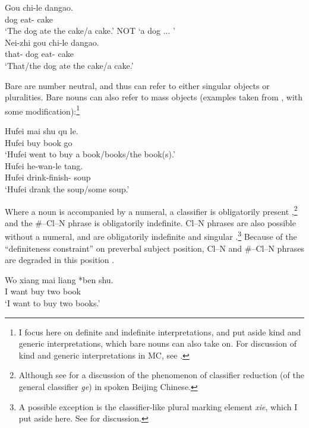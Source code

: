 \documentclass[output=paper
,modfonts
,nonflat]{langsci/langscibook}
\begin{document}
\ea \label{ex:hall:3}
\ea \label{ex:hall:3a}
\gll Gou chi-le dangao. \\
 dog eat-{} cake \\
\glt `The dog ate the cake/a cake.' NOT `a dog ... ' \\
\ex \label{ex:hall:3b}
\gll Nei-zhi gou chi-le dangao. \\
that-{} dog eat-{} cake \\
\glt `That/the dog ate the cake/a cake.' \\
\z
\z

Bare  are number neutral, and thus can refer to either singular objects or pluralities. Bare nouns can also refer to mass objects (examples taken from \citealt{ChengSybesma1999}, with some modification):\footnote{I focus here on definite and indefinite interpretations, and put aside kind and generic interpretations, which bare nouns can also take on. For discussion of kind and generic interpretations in MC, see \citet{Krifka1995}.}

\ea \label{ex:hall:4}
\ea
\gll Hufei mai shu qu le.\\
 Hufei buy book go {}\\
\glt `Hufei went to buy a book/books/the book(s).'\\

\ex
\gll Hufei he-wan-le tang.\\
 Hufei drink-finish-{} soup\\
\glt `Hufei drank the soup/some soup.'\\
\z
\z


Where a noun is accompanied by a numeral, a classifier is obligatorily present ,\footnote{Although see \citet{Tao2006} for a discussion of the phenomenon of classifier reduction (of the general classifier \textit{ge}) in spoken Beijing  Chinese.} and the \#--Cl--N phrase is obligatorily indefinite. Cl--N phrases are also possible without a numeral, and are obligatorily indefinite and singular .\footnote{A possible exception is the classifier-like plural marking element \textit{xie}, which I put aside here. See \citet[\S4.2.3]{Hall2015} for discussion.} Because of the ``definiteness constraint'' on preverbal subject position, Cl--N and \#--Cl--N phrases are degraded in this position . 

\ea \label{ex:hall:5}
\gll 
Wo xiang mai liang \textnormal{*}{\op}ben{\cp} shu.\\
I want buy two  book\\
\glt 
`I want to buy two books.'\\
\z\vspace{-.5\baselineskip}
\end{document}
